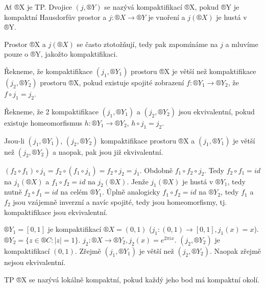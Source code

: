 \documentclass[12pt]{article}					%
\begin{document}
    \begin{definice}[Kompaktifikace]
        Ať ®X je TP. Dvojice $(j, ®Y)$ se nazývá kompaktifikací ®X, pokud ®Y je kompaktní Hausdorfův prostor a $j: ®X \rightarrow ®Y$ je vnoření a $j(®X)$ je hustá v ®Y.

        Prostor ®X a $j(®X)$ se často ztotožňují, tedy pak zapomínáme na $j$ a mluvíme pouze o ®Y, jakožto kompaktifikaci.

        Řekneme, že kompaktifikace $(j_1, ®Y_1)$ prostoru ®X je větší než kompaktifikace $(j_2, ®Y_2)$ prostoru ®X, pokud existuje spojité zobrazení $f: ®Y_1 \rightarrow ®Y_2$, že $f\circ j_1 = j_2$.

        Řekneme, že 2 kompaktifikace $(j_1, ®Y_1)$ a $(j_2, ®Y_2)$ jsou ekvivalentní, pokud existuje homeomorfismus $h: ®Y_1 \rightarrow ®Y_2$, $h \circ j_1 = j_2$.
    \end{definice}

    \begin{poznamka}
        Jsou-li $(j_1, ®Y_1)$, $(j_2, ®Y_2)$ kompaktifikace prostoru ®X a $(j_1, ®Y_1)$ je větší než $(j_2, ®Y_2)$ a naopak, pak jsou již ekvivalentní.
        \begin{dukazin}
            $(f_2 \circ f_1)\circ j_1 = f_2 \circ (f_1  \circ j_1) = f_2 \circ j_2 = j_1$. Obdobně $f_1 \circ f_2 \circ j_2$. Tedy $f_2 \circ f_1 = id$ na $j_1(®X)$ a $f_1 \circ f_2 = id$ na $j_2(®X)$. Jenže $j_1(®X)$ je hustá v $®Y_1$, tedy nutně $f_2 \circ f_1 = id$ na celém $®Y_1$. Úplně analogicky $f_1 \circ f_2 = id$ na $®Y_2$, tedy $f_1$ a $f_2$ jsou vzájemně inverzní a navíc spojité, tedy jsou homeomorfismy, tj. kompaktifikace jsou ekvivalentní.
        \end{dukazin}
    \end{poznamka}

    \begin{priklady}
        $®Y_1 = [0, 1]$ je kompaktifikací $®X = (0, 1)$ ($j_1: (0, 1) \rightarrow [0, 1], j_1(x) = x$). $®Y_2 = \{z \in ®C: |z| = 1\}$. $j_2: ®X \rightarrow ®Y_2, j_2(x) = e^{2 \pi i x}$. $(j_2, ®Y_2)$ je kompaktifikací $(0, 1)$. Zřejmě $(j_1, ®Y_1)$ je větší než $(j_2, ®Y_2)$. Naopak zřejmě nejsou ekvivalentní.
    \end{priklady}

    \begin{definice}
        TP ®X se nazývá lokálně kompaktní, pokud každý jeho bod má kompaktní okolí.
    \end{definice}
\end{document}
